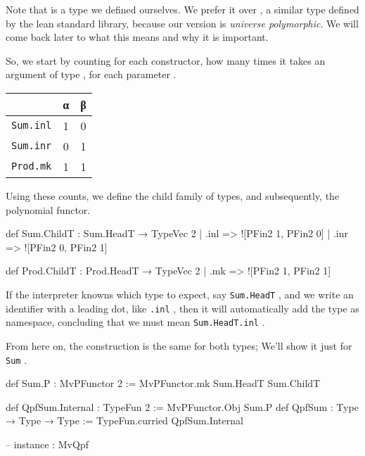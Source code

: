 \documentclass[titlepage]{report}
\newenvironment{remark}{%
\begin{framed}
\begin{trivlist}
    \item[\hskip \labelsep {\bfseries Remark:}]}%
{%
\end{trivlist}%
\end{framed}
}
\newcommand\lean[1]{{%
\def\leanmode{1}%
\small \texttt{#1}%
\undef\leanmode%
}}
\begin{document}
\begin{remark}
    Note that  is a type we defined ourselves. We prefer it over , a similar
    type defined by the lean standard library, because our version is \emph{universe polymorphic}.
    We will come back later to what this means and why it is important.
\end{remark}

So, we start by counting for each constructor, how many times it takes an argument of type ,
for each parameter .
\begin{center}
\begin{tabular}{l|c|c}
    & α & β \\ \hline
    \lean{Sum.inl}  & 1 & 0 \\
    \lean{Sum.inr}  & 0 & 1 \\
    \lean{Prod.mk}  & 1 & 1 \\    
\end{tabular}    
\end{center}

Using these counts, we define the child family of types, and subsequently, the polynomial functor.

\begin{center}
  \begin{leancode}
    def Sum.ChildT : Sum.HeadT → TypeVec 2
      | .inl => ![PFin2 1, PFin2 0]
      | .inr => ![PFin2 0, PFin2 1]

    def Prod.ChildT : Prod.HeadT → TypeVec 2
      | .mk  => ![PFin2 1, PFin2 1]
  \end{leancode}
\end{center}

\begin{remark}
    If the interpreter knowns which type to expect, say \lean{Sum.HeadT}, and we write an identifier with a leading
    dot, like \lean{.inl}, then it will automatically add the type as namespace, concluding that
    we must mean \lean{Sum.HeadT.inl}.
\end{remark}
From here on, the construction is the same for both types;
We'll show it just for \lean{Sum}.
\begin{center}
    \begin{leancode}
    def Sum.P  : MvPFunctor 2 := MvPFunctor.mk Sum.HeadT  Sum.ChildT

    
    def QpfSum.Internal : TypeFun 2  := MvPFunctor.Obj Sum.P
    def QpfSum : Type → Type → Type := TypeFun.curried QpfSum.Internal

    -- instance : MvQpf 
  \end{leancode}
\end{center}
\end{document}
